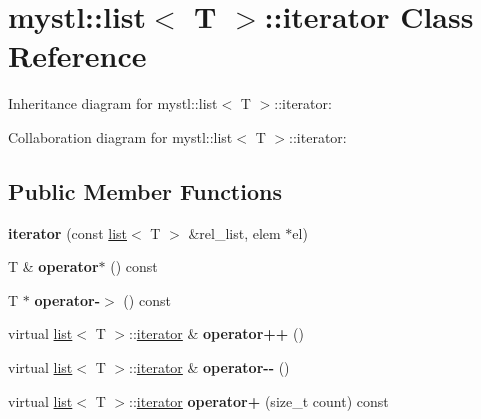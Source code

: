 \hypertarget{classmystl_1_1list_1_1iterator}{}\section{mystl\+:\+:list$<$ T $>$\+:\+:iterator Class Reference}
\label{classmystl_1_1list_1_1iterator}


Inheritance diagram for mystl\+:\+:list$<$ T $>$\+:\+:iterator\+:


Collaboration diagram for mystl\+:\+:list$<$ T $>$\+:\+:iterator\+:
\subsection*{Public Member Functions}
\begin{DoxyCompactItemize}
\item 
\mbox{\label{classmystl_1_1list_1_1iterator_ac51d73eb35e52b156aee4cd7e1763092}} 
{\bfseries iterator} (const \hyperlink{classmystl_1_1list}{list}$<$ T $>$ \&rel\+\_\+list, elem $\ast$el)
\item 
\mbox{\label{classmystl_1_1list_1_1iterator_a8aca3e8e114c26434f9c389659e42b80}} 
T \& {\bfseries operator$\ast$} () const
\item 
\mbox{\label{classmystl_1_1list_1_1iterator_aac6181fb803dee0367871722ce96ed15}} 
T $\ast$ {\bfseries operator-\/$>$} () const
\item 
\mbox{\label{classmystl_1_1list_1_1iterator_ad8af567264fedbedc2136dae1aa76e1b}} 
virtual \hyperlink{classmystl_1_1list}{list}$<$ T $>$\+::\hyperlink{classmystl_1_1list_1_1iterator}{iterator} \& {\bfseries operator++} ()
\item 
\mbox{\label{classmystl_1_1list_1_1iterator_a144d4b4c01cd54cecdb3b06fbbe0c277}} 
virtual \hyperlink{classmystl_1_1list}{list}$<$ T $>$\+::\hyperlink{classmystl_1_1list_1_1iterator}{iterator} \& {\bfseries operator-\/-\/} ()
\item 
\mbox{\label{classmystl_1_1list_1_1iterator_a73269c0df6a077d13895fbe8f49414a5}} 
virtual \hyperlink{classmystl_1_1list}{list}$<$ T $>$\+::\hyperlink{classmystl_1_1list_1_1iterator}{iterator} {\bfseries operator+} (size\+\_\+t count) const

\end{DoxyCompactItemize}
